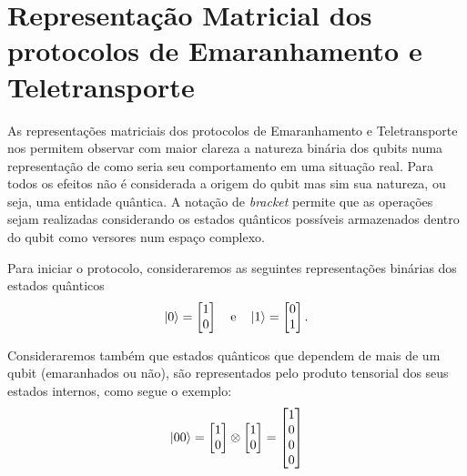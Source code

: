 
\chapter{Representação Matricial dos protocolos de Emaranhamento e Teletransporte}\label{app:matricial}

As representações matriciais dos protocolos de Emaranhamento e Teletransporte nos permitem observar com maior clareza a natureza binária dos qubits numa representação de como seria seu comportamento em uma situação real. Para todos os efeitos não é considerada a origem do qubit mas sim sua natureza, ou seja, uma entidade quântica. A notação de \textit{bracket} permite que as operações sejam realizadas considerando os estados quânticos possíveis armazenados dentro do qubit como versores num espaço complexo.

Para iniciar o protocolo, consideraremos as seguintes representações binárias dos estados quânticos
\begin{equation} \label{eq:01}
\ket{0} = \begin{bmatrix}
1 \\
0
\end{bmatrix} \quad \text{e} \quad
\ket{1} = \begin{bmatrix}
0 \\
1
\end{bmatrix}.
\end{equation}

Consideraremos também que estados quânticos que dependem de mais de um qubit (emaranhados ou não), são representados pelo produto tensorial dos seus estados internos, como segue o exemplo:
\begin{equation}\label{eq:00}
\ket{00} = \begin{bmatrix}
1 \\
0
\end{bmatrix} \otimes \begin{bmatrix}
1 \\
0
\end{bmatrix} = \begin{bmatrix}
1 \\
0 \\
0 \\
0
\end{bmatrix}
\end{equation}

